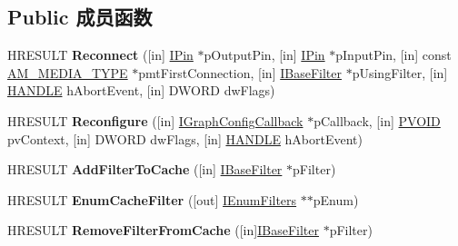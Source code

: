 \subsection*{Public 成员函数}
\begin{DoxyCompactItemize}
\item 
\mbox{\label{interface_i_graph_config_a015d5bd4434bc5eb2584ca2b6dc55e3f}} 
H\+R\+E\+S\+U\+LT {\bfseries Reconnect} (\mbox{[}in\mbox{]} \hyperlink{interface_i_pin}{I\+Pin} $\ast$p\+Output\+Pin, \mbox{[}in\mbox{]} \hyperlink{interface_i_pin}{I\+Pin} $\ast$p\+Input\+Pin, \mbox{[}in\mbox{]} const \hyperlink{struct_a_m___m_e_d_i_a___t_y_p_e}{A\+M\+\_\+\+M\+E\+D\+I\+A\+\_\+\+T\+Y\+PE} $\ast$pmt\+First\+Connection, \mbox{[}in\mbox{]} \hyperlink{interface_i_base_filter}{I\+Base\+Filter} $\ast$p\+Using\+Filter, \mbox{[}in\mbox{]} \hyperlink{interfacevoid}{H\+A\+N\+D\+LE} h\+Abort\+Event, \mbox{[}in\mbox{]} D\+W\+O\+RD dw\+Flags)
\item 
\mbox{\label{interface_i_graph_config_a40ddb1a68fa11d577894deae82f710a1}} 
H\+R\+E\+S\+U\+LT {\bfseries Reconfigure} (\mbox{[}in\mbox{]} \hyperlink{interface_i_graph_config_callback}{I\+Graph\+Config\+Callback} $\ast$p\+Callback, \mbox{[}in\mbox{]} \hyperlink{interfacevoid}{P\+V\+O\+ID} pv\+Context, \mbox{[}in\mbox{]} D\+W\+O\+RD dw\+Flags, \mbox{[}in\mbox{]} \hyperlink{interfacevoid}{H\+A\+N\+D\+LE} h\+Abort\+Event)
\item 
\mbox{\label{interface_i_graph_config_a62c0b4fecaa784fead04dca373d5358a}} 
H\+R\+E\+S\+U\+LT {\bfseries Add\+Filter\+To\+Cache} (\mbox{[}in\mbox{]} \hyperlink{interface_i_base_filter}{I\+Base\+Filter} $\ast$p\+Filter)
\item 
\mbox{\label{interface_i_graph_config_a7aa8423e976b639143b77a9c00af345b}} 
H\+R\+E\+S\+U\+LT {\bfseries Enum\+Cache\+Filter} (\mbox{[}out\mbox{]} \hyperlink{interface_i_enum_filters}{I\+Enum\+Filters} $\ast$$\ast$p\+Enum)
\item 
\mbox{\label{interface_i_graph_config_a12fc0765c7d777567c037f39914b4ad9}} 
H\+R\+E\+S\+U\+LT {\bfseries Remove\+Filter\+From\+Cache} (\mbox{[}in\mbox{]}\hyperlink{interface_i_base_filter}{I\+Base\+Filter} $\ast$p\+Filter)
\item 
$$
\end{DoxyCompactItemize}
